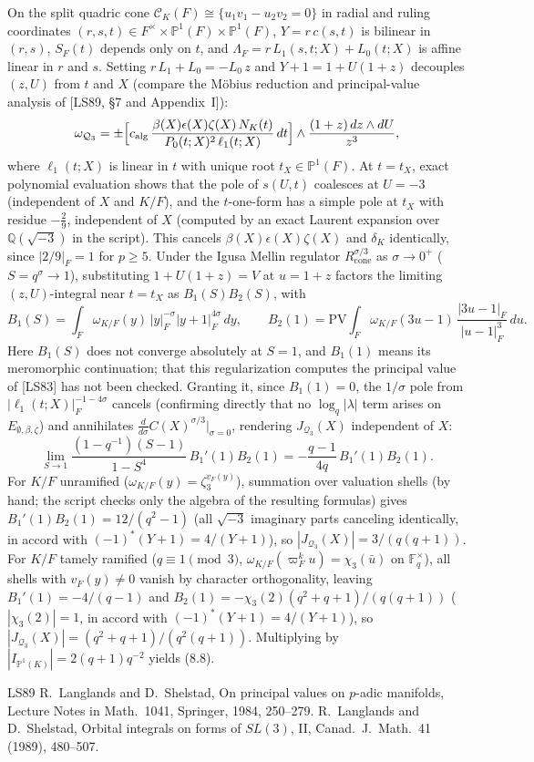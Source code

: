 \documentclass[12pt,letterpaper]{amsart}
\begin{document}
On the split quadric cone $\mathcal C_K(F)\cong\{u_1v_1-u_2v_2=0\}$ in radial
and ruling coordinates $(r,s,t)\in F^\times\times\mathbb{P}^1(F)\times\mathbb{P}^1(F)$,
$Y=r\,c(s,t)$ is bilinear in $(r,s)$, $S_F(t)$ depends only on $t$, and
$\Lambda_F=r\,L_1(s,t;X)+L_0(t;X)$ is affine linear in $r$ and $s$. Setting
$r\,L_1+L_0=-L_0\,z$ and $Y+1=1+U(1+z)$ decouples $(z,U)$ from $t$ and $X$
(compare the M\"obius reduction and principal-value analysis of
[LS89, \S7 and Appendix~I]):
\[
\omega_{\mathcal Q_3}=\pm\Bigl[c_{\mathrm{alg}}\,
\frac{\beta(X)\epsilon(X)\zeta(X)\,N_K(t)}{P_0(t;X)^2\,\ell_1(t;X)}\,dt\Bigr]
\wedge\frac{(1+z)\,dz\wedge dU}{z^3},
\]
where $\ell_1(t;X)$ is linear in $t$ with unique root $t_X\in\mathbb{P}^1(F)$.
At $t=t_X$, exact polynomial evaluation shows that the pole of $s(U,t)$
coalesces at $U=-3$ (independent of $X$ and $K/F$), and the $t$-one-form has a
simple pole at $t_X$ with residue $-\frac{2}{9}$, independent of $X$
(computed by an exact Laurent expansion over $\mathbb Q(\sqrt{-3})$ in the
script). This
cancels $\beta(X)\epsilon(X)\zeta(X)$ and $\delta_K$ identically, since
$|2/9|_F=1$ for $p\ge 5$. Under the Igusa Mellin regulator $R_{\mathrm{cone}}^{\sigma/3}$ as
$\sigma\to 0^+$ ($S=q^\sigma\to 1$), substituting $1+U(1+z)=V$ at $u=1+z$
factors the limiting $(z,U)$-integral near $t=t_X$ as $B_1(S)B_2(S)$, with
\[
B_1(S)=\int_F\omega_{K/F}(y)\,|y|_F^{-\sigma}|y+1|_F^{4\sigma}\,dy,\qquad
B_2(1)=\mathrm{PV}\!\int_F\omega_{K/F}(3u-1)\,\frac{|3u-1|_F}{|u-1|_F^3}\,du.
\]
Here $B_1(S)$ does not converge absolutely at $S=1$, and $B_1(1)$ means its
meromorphic continuation; that this regularization computes the principal value
of [LS83] has not been checked. Granting it, since $B_1(1)=0$, the
$1/\sigma$ pole from $|\ell_1(t;X)|_F^{-1-4\sigma}$
cancels (confirming directly that no $\log_q|\lambda|$ term arises on
$E_{\emptyset,\beta,\zeta}$) and annihilates $\frac{d}{d\sigma}C(X)^{\sigma/3}\big|_{\sigma=0}$,
rendering $J_{\mathcal Q_3}(X)$ independent of $X$:
\[
\lim_{S\to 1}\frac{(1-q^{-1})(S-1)}{1-S^4}\,B_1'(1)B_2(1)
=-\frac{q-1}{4q}\,B_1'(1)B_2(1).
\]
For $K/F$ unramified ($\omega_{K/F}(y)=\zeta_3^{v_F(y)}$), summation over
valuation shells (by hand; the script checks only the algebra of the resulting
formulas) gives $B_1'(1)B_2(1)=12/(q^2-1)$ (all $\sqrt{-3}$ imaginary
parts canceling identically, in accord with $(-1)^*(Y+1)=4/(Y+1)$), so
$|J_{\mathcal Q_3}(X)|=3/(q(q+1))$. For $K/F$ tamely ramified ($q\equiv 1\pmod 3$,
$\omega_{K/F}(\varpi_F^k u)=\chi_3(\bar u)$ on $\mathbb F_q^\times$), all shells
with $v_F(y)\neq 0$ vanish by character orthogonality, leaving
$B_1'(1)=-4/(q-1)$ and $B_2(1)=-\chi_3(2)(q^2+q+1)/(q(q+1))$ ($|\chi_3(2)|=1$,
in accord with $(-1)^*(Y+1)=4/(Y+1)$), so
$|J_{\mathcal Q_3}(X)|=(q^2+q+1)/(q^2(q+1))$. Multiplying by
$|I_{\mathbb{P}^1(K)}|=2(q+1)q^{-2}$ yields (8.8).


\begin{thebibliography}{LS89}
 R.~Langlands and D.~Shelstad, On principal values on
$p$-adic manifolds, Lecture Notes in Math.\ 1041, Springer, 1984, 250--279.
 R.~Langlands and D.~Shelstad, Orbital integrals on forms
of $SL(3)$, II, Canad.\ J.\ Math.\ 41 (1989), 480--507.
\end{thebibliography}
\end{document}
